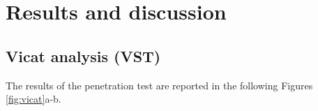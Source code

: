 \documentclass[a4paper, 11pt]{article}
\begin{document}
\section{Results and discussion}

\subsection{Vicat analysis (VST)}

The results of the penetration test are reported in the following Figures \ref{fig:vicat}a-b.

\begin{figure}[htp]
	\centering
	\qquad
	\subfloat[][]

\end{figure}
\end{document}
